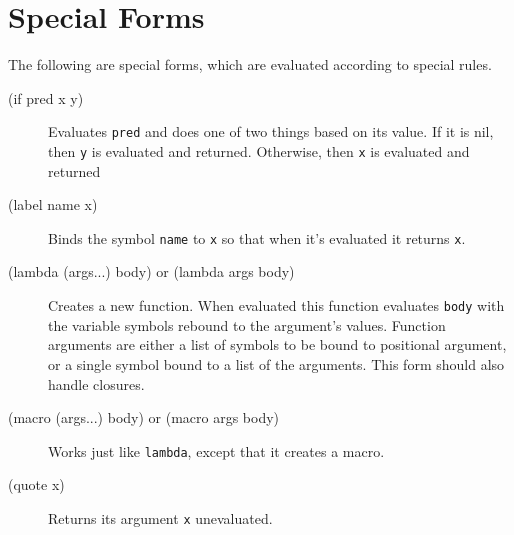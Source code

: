 \documentclass[12pt]{article}
\begin{document}
\section{Special Forms}

The following are special forms, which are evaluated according to special rules.

\begin{description}
\item[(if pred x y)] Evaluates \verb!pred! and does one of two things based on
  its value. If it is nil, then \verb!y! is evaluated and returned. Otherwise,
  then \verb!x! is evaluated and returned

\item[(label name x)] Binds the symbol \verb!name! to \verb!x! so that when it's
  evaluated it returns \verb!x!.

\item[(lambda (args...) body) or (lambda args body)] Creates a new
  function. When evaluated this function evaluates \verb!body! with the
  variable symbols rebound to the argument's values.  Function arguments are
  either a list of symbols to be bound to positional argument, or a single
  symbol bound to a list of the arguments. This form should also handle
  closures.

\item[(macro (args...) body) or (macro args body)] Works just like
  \verb!lambda!, except that it creates a macro.

\item[(quote x)] Returns its argument \verb!x! unevaluated.
\end{description}
\end{document}
